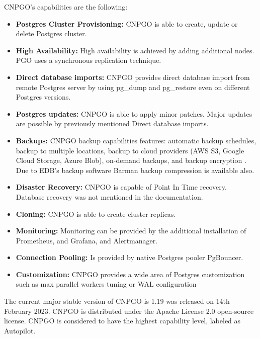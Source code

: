 CNPGO’s capabilities are the following:
\begin{itemize}
  \item \textbf{Postgres Cluster Provisioning:} CNPGO is able to create, update or delete Postgres cluster. \cite{CNPGdocuCapabilityLevels}
  \item \textbf{High Availability:} High availability is achieved by adding additional nodes. PGO uses a synchronous replication technique. \cite{CNPGdocuReplication}
  \item \textbf{Direct database imports:} CNPGO provides direct database import from remote Postgres server by using pg\_dump and pg\_restore even on different Postgres versions. \cite{CNPGdocuDatabaseImports}
  \item \textbf{Postgres updates:} CNPGO is able to apply minor patches. \cite{CNPGdocuUpdates} Major updates are possible by previously mentioned Direct database imports.
  \item \textbf{Backups:} CNPGO backup capabilities features: automatic backup schedules, backup to multiple locations, backup to cloud providers (AWS S3, Google Cloud Storage, Azure Blob), on-demand backups, and backup encryption \cite{CNPGdocuBackup}\cite{CNPGdocuTDE}. Due to EDB’s backup software Barman backup compression is available also. \cite{CNPGdocuBackup}
  \item \textbf{Disaster Recovery:} CNPGO is capable of Point In Time recovery. Database recovery was not mentioned in the documentation. \cite{CNPGdocuBackup}
  \item \textbf{Cloning:} CNPGO is able to create cluster replicas. \cite{CNPGdocuReplication}
  \item \textbf{Monitoring:} Monitoring can be provided by the additional installation of Prometheus, and Grafana, and Alertmanager. \cite{CNPGdocuQuickstart}
  \item \textbf{Connection Pooling:} Is provided by native Postgres pooler PgBouncer. \cite{CNPGdocuConnectionPooling}
  \item \textbf{Customization:} CNPGO provides a wide area of Postgres customization such as max parallel workers tuning or WAL configuration \cite{CNPGdocuConfiguration}
\end{itemize}

The current major stable version of CNPGO is 1.19 was released on 14th February 2023. CNPGO is distributed under the Apache License 2.0 open-source license. CNPGO is considered to have the highest capability level, labeled as Autopilot. \cite{CNPGdocu}

